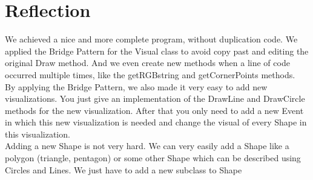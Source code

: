 \documentclass[a4paper,12pt]{article}
\begin{document}
\section{Reflection}
We achieved a nice and more complete program, without duplication code. We applied the Bridge Pattern for the Visual class to avoid copy past and editing the original Draw method. And we even create new methods when a line of code occurred multiple times, like the getRGBstring and getCornerPoints methods.
\\
By applying the Bridge Pattern, we also made it very easy to add new visualizations. You just give an implementation of the DrawLine and DrawCircle methods for the new visualization. After that you only need to add a new Event in which this new visualization is needed and change the visual of every Shape in this visualization.
\\
Adding a new Shape is not very hard. We can very easily add a Shape like a polygon (triangle, pentagon) or some other Shape which can be described using Circles and Lines. We just have to add a new subclass to Shape
\end{document}
